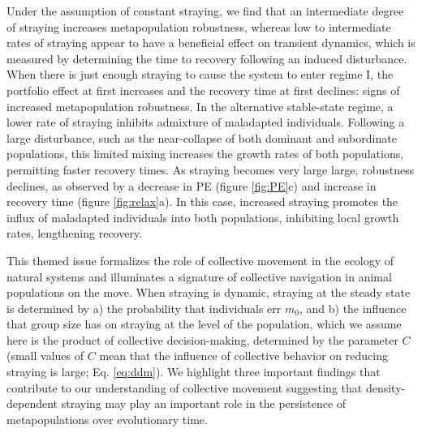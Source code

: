 \documentclass{revtex4}
\begin{document}

Under the assumption of constant straying, we find that an intermediate degree of straying increases metapopulation robustness, whereas low to intermediate rates of straying appear to have a beneficial effect on transient dynamics, which is measured by determining the time to recovery following an induced disturbance.
When there is just enough straying to cause the system to enter regime I, the portfolio effect at first increases and the recovery time at first declines: signs of increased metapopulation robustness.
In the alternative stable-state regime, a lower rate of straying inhibits admixture of maladapted individuals.
Following a large disturbance, such as the near-collapse of both dominant and subordinate populations, this limited mixing increases the growth rates of both populations, permitting faster recovery times. 
As straying becomes very large large, robustness declines, as observed by a decrease in PE (figure \ref{fig:PE}c) and increase in recovery time (figure \ref{fig:relax}a).
In this case, increased straying promotes the influx of maladapted individuals into both populations, inhibiting local growth rates, lengthening recovery.





This themed issue formalizes the role of collective movement in the ecology of natural systems and illuminates a signature of collective navigation in animal populations on the move.
When straying is dynamic, straying at the steady state is determined by a) the probability that individuals err $m_0$, and b) the influence that group size has on straying at the level of the population, which we assume here is the product of collective decision-making, determined by the parameter $C$ (small values of $C$ mean that the influence of collective behavior on reducing straying is large; Eq. \ref{eq:ddm}).
We highlight three important findings that contribute to our understanding of collective movement suggesting that density-dependent straying may play an important role in the persistence of metapopulations over evolutionary time.
\end{document}
